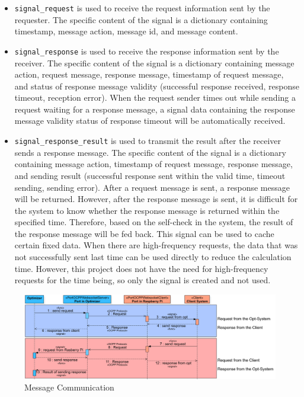 \documentclass[
english,
ruledheaders=section,%
class=report,%
thesis={type=Report},%
accentcolor=9c,%
custommargins=true,%
marginpar=false,%
parskip=half-,%
fontsize=11pt,%
logofile={img/tuda_logo.pdf}, %
]{tudapub}
\begin{document}
\begin{itemize}
        \item \texttt{signal\_request} is used to receive the request information sent by the requester. The specific content of the signal is a dictionary containing timestamp, message action, message id, and message content. \item \texttt{signal\_response} is used to receive the response information sent by the receiver. The specific content of the signal is a dictionary containing message action, request message, response message, timestamp of request message, and status of response message validity (successful response received, response timeout, reception error). When the request sender times out while sending a request waiting for a response message, a signal data containing the response message validity status of response timeout will be automatically received.
        \item \texttt{signal\_response\_result} is used to transmit the result after the receiver sends a response message. The specific content of the signal is a dictionary containing message action, timestamp of request message, response message, and sending result (successful response sent within the valid time, timeout sending, sending error). After a request message is sent, a response message will be returned. However, after the response message is sent, it is difficult for the system to know whether the response message is returned within the specified time. Therefore, based on the self-check in the system, the result of the response message will be fed back. This signal can be used to cache certain fixed data. When there are high-frequency requests, the data that was not successfully sent last time can be used directly to reduce the calculation time. However, this project does not have the need for high-frequency requests for the time being, so only the signal is created and not used.
    \end{itemize}
    \begin{figure}[H]
        \centering
        \includegraphics[width=1\linewidth]{img/SignalMsgCommuication.png}
        \caption{Message Communication}
        \label{fig:signalMsgCommunication}
    \end{figure}
\end{document}
